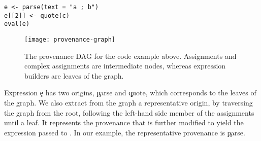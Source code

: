 \documentclass[screen,acmsmall]{acmart}
\begin{document}
\begin{lstlisting}
e <- parse(text = "a ; b")
e[[2]] <- quote(c)
eval(e)
\end{lstlisting}

\begin{figure}[h]
\centering
\texttt{[image: provenance-graph]}
\caption{The provenance DAG for the code example above. Assignments and complex assignments are intermediate nodes, whereas expression builders are leaves of the graph.} \label{fig:provgraph}
\end{figure}



Expression \c{e} has two origins, \c{parse} and \c{quote}, which corresponds to the leaves of the graph. We also extract from the graph a representative origin, by traversing the graph from the root, following the left-hand side member of the assignments until a leaf. It represents the provenance that is further modified to yield the expression passed to \eval. In our example, the representative provenance is \c{parse}.
\end{document}
